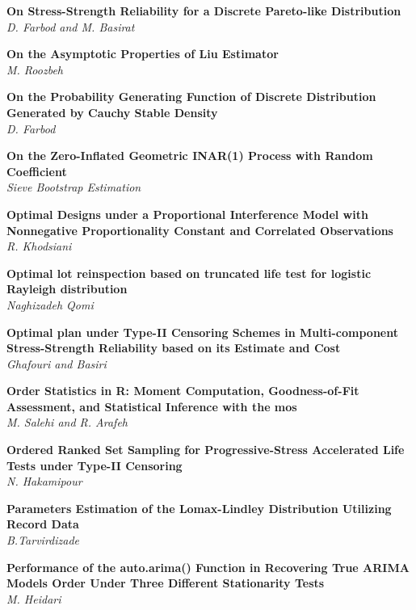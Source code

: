 \noindent
{\bf
On Stress-Strength Reliability for a Discrete Pareto-like Distribution
}\dotfill \pageref{p.1109}\\
{\small \it
D. Farbod and M. Basirat
}


\noindent
{\bf
On the Asymptotic Properties of Liu Estimator
}\dotfill \pageref{p.1330}\\
{\small \it
M. Roozbeh
}


\noindent
{\bf
On the Probability Generating Function of Discrete Distribution Generated by Cauchy Stable Density
}\dotfill \pageref{p.1023}\\
{\small \it
D. Farbod
}


\noindent
{\bf
On the Zero-Inflated Geometric INAR(1) Process with Random Coefficient
}\dotfill \pageref{p.1035}\\
{\small \it
Sieve Bootstrap Estimation
}


\noindent
{\bf
Optimal Designs under a Proportional Interference Model with Nonnegative Proportionality Constant and Correlated Observations
}\dotfill \pageref{p.1098}\\
{\small \it
R. Khodsiani
}


\noindent
{\bf
Optimal lot reinspection based on truncated life test for logistic Rayleigh distribution
}\dotfill \pageref{p.1045}\\
{\small \it
Naghizadeh Qomi
}


\noindent
{\bf
Optimal plan under Type-II Censoring Schemes in Multi-component Stress-Strength Reliability based on its Estimate and Cost
}\dotfill \pageref{p.1319}\\
{\small \it
Ghafouri and Basiri
}


\noindent
{\bf
Order Statistics in R: Moment Computation, Goodness-of-Fit Assessment, and Statistical Inference with the mos
}\dotfill \pageref{p.1334}\\
{\small \it
M. Salehi and R. Arafeh
}


\noindent
{\bf
Ordered Ranked Set Sampling for Progressive-Stress Accelerated Life Tests under Type-II Censoring
}\dotfill \pageref{p.1245}\\
{\small \it
N. Hakamipour
}


\noindent
{\bf
Parameters Estimation of the Lomax-Lindley Distribution Utilizing Record Data
}\dotfill \pageref{p.1189}\\
{\small \it
B.Tarvirdizade
}


\noindent
{\bf
Performance of the auto.arima() Function in Recovering True ARIMA Models Order Under Three Different Stationarity Tests
}\dotfill \pageref{p.1050}\\
{\small \it
M. Heidari
}


